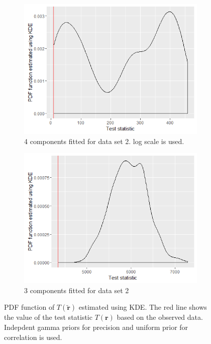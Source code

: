\begin{figure}[!h]
	\centering
	\begin{subfigure}[b]{0.4\textwidth}
		\includegraphics[width=\textwidth]{mainmatter/chapter_5_simulation_study/indpGammaPrior_ppc_3wellsep4comp.png}
        \caption{\label{fig : ppc_3wellsep3comp_indp_gammaprior}4 components fitted for data set 2. log scale is used.}
	\end{subfigure}
	\begin{subfigure}[b]{0.4\textwidth}
		\includegraphics[width=\textwidth]{mainmatter/chapter_5_simulation_study/indpGammaPrior_ppc_3wellsep3comp.png}
        \caption{\label{fig : ppc_3wellsep3comp_indp_gammaprior}3 components fitted for data set 2}
	\end{subfigure}
	\caption{PDF function of $T(\boldsymbol{\tilde{r}})$ estimated using KDE. The red line shows the value of the test statistic $T(\boldsymbol{r})$ based on the observed data. Indepdent gamma priors for precision and uniform prior for correlation is used.}
	\label{fig : ppc_3wellsep4comp_indp_gammaprior}
\end{figure}